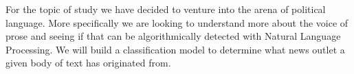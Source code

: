 For the topic of study we have decided to venture into the arena of political language. 
More specifically we are looking to understand more about the voice of prose and seeing if that can be algorithmically detected with Natural Language Processing.
We will build a classification model to determine what news outlet a given body of text has originated from. 

